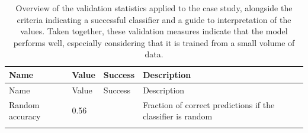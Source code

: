 \documentclass[11pt]{article}
\begin{document}
\hypertarget{tbl:validation}{}
\begin{longtable}[]{@{}llll@{}}
\caption{\label{tbl:validation}Overview of the validation statistics
applied to the case study, alongside the criteria indicating a
successful classifier and a guide to interpretation of the values. Taken
together, these validation measures indicate that the model performs
well, especially considering that it is trained from a small volume of
data.}\tabularnewline
\toprule
\begin{minipage}[b]{0.21\columnwidth}\raggedright
Name\strut
\end{minipage} & \begin{minipage}[b]{0.05\columnwidth}\raggedright
Value\strut
\end{minipage} & \begin{minipage}[b]{0.13\columnwidth}\raggedright
Success\strut
\end{minipage} & \begin{minipage}[b]{0.49\columnwidth}\raggedright
Description\strut
\end{minipage}\tabularnewline
\midrule
\endfirsthead
\toprule
\begin{minipage}[b]{0.21\columnwidth}\raggedright
Name\strut
\end{minipage} & \begin{minipage}[b]{0.05\columnwidth}\raggedright
Value\strut
\end{minipage} & \begin{minipage}[b]{0.13\columnwidth}\raggedright
Success\strut
\end{minipage} & \begin{minipage}[b]{0.49\columnwidth}\raggedright
Description\strut
\end{minipage}\tabularnewline
\midrule
\endhead
\begin{minipage}[t]{0.21\columnwidth}\raggedright
Random accuracy\strut
\end{minipage} & \begin{minipage}[t]{0.05\columnwidth}\raggedright
0.56\strut
\end{minipage} & \begin{minipage}[t]{0.13\columnwidth}\raggedright
\strut
\end{minipage} & \begin{minipage}[t]{0.49\columnwidth}\raggedright
Fraction of correct predictions if the classifier is random\strut
\end{minipage}\tabularnewline
\begin{minipage}[t]{0.21\columnwidth}\raggedright

\end{minipage}
\end{longtable}
\end{document}
